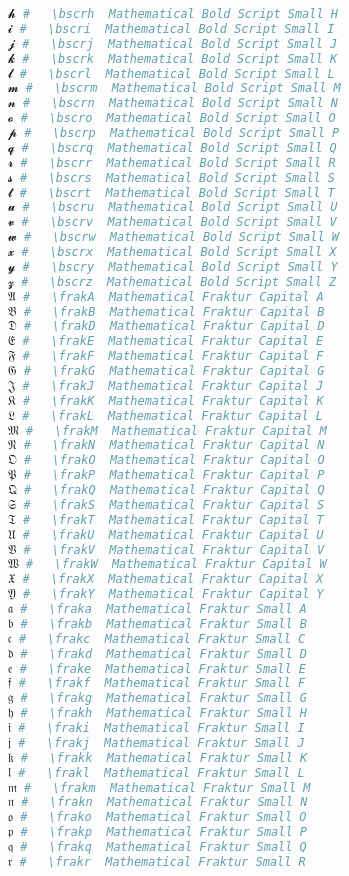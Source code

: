 \begin{lstlisting}[language=Julia, style=julia]
𝓱 #   \bscrh  Mathematical Bold Script Small H
𝓲 #   \bscri  Mathematical Bold Script Small I
𝓳 #   \bscrj  Mathematical Bold Script Small J
𝓴 #   \bscrk  Mathematical Bold Script Small K
𝓵 #   \bscrl  Mathematical Bold Script Small L
𝓶 #   \bscrm  Mathematical Bold Script Small M
𝓷 #   \bscrn  Mathematical Bold Script Small N
𝓸 #   \bscro  Mathematical Bold Script Small O
𝓹 #   \bscrp  Mathematical Bold Script Small P
𝓺 #   \bscrq  Mathematical Bold Script Small Q
𝓻 #   \bscrr  Mathematical Bold Script Small R
𝓼 #   \bscrs  Mathematical Bold Script Small S
𝓽 #   \bscrt  Mathematical Bold Script Small T
𝓾 #   \bscru  Mathematical Bold Script Small U
𝓿 #   \bscrv  Mathematical Bold Script Small V
𝔀 #   \bscrw  Mathematical Bold Script Small W
𝔁 #   \bscrx  Mathematical Bold Script Small X
𝔂 #   \bscry  Mathematical Bold Script Small Y
𝔃 #   \bscrz  Mathematical Bold Script Small Z
𝔄 #   \frakA  Mathematical Fraktur Capital A
𝔅 #   \frakB  Mathematical Fraktur Capital B
𝔇 #   \frakD  Mathematical Fraktur Capital D
𝔈 #   \frakE  Mathematical Fraktur Capital E
𝔉 #   \frakF  Mathematical Fraktur Capital F
𝔊 #   \frakG  Mathematical Fraktur Capital G
𝔍 #   \frakJ  Mathematical Fraktur Capital J
𝔎 #   \frakK  Mathematical Fraktur Capital K
𝔏 #   \frakL  Mathematical Fraktur Capital L
𝔐 #   \frakM  Mathematical Fraktur Capital M
𝔑 #   \frakN  Mathematical Fraktur Capital N
𝔒 #   \frakO  Mathematical Fraktur Capital O
𝔓 #   \frakP  Mathematical Fraktur Capital P
𝔔 #   \frakQ  Mathematical Fraktur Capital Q
𝔖 #   \frakS  Mathematical Fraktur Capital S
𝔗 #   \frakT  Mathematical Fraktur Capital T
𝔘 #   \frakU  Mathematical Fraktur Capital U
𝔙 #   \frakV  Mathematical Fraktur Capital V
𝔚 #   \frakW  Mathematical Fraktur Capital W
𝔛 #   \frakX  Mathematical Fraktur Capital X
𝔜 #   \frakY  Mathematical Fraktur Capital Y
𝔞 #   \fraka  Mathematical Fraktur Small A
𝔟 #   \frakb  Mathematical Fraktur Small B
𝔠 #   \frakc  Mathematical Fraktur Small C
𝔡 #   \frakd  Mathematical Fraktur Small D
𝔢 #   \frake  Mathematical Fraktur Small E
𝔣 #   \frakf  Mathematical Fraktur Small F
𝔤 #   \frakg  Mathematical Fraktur Small G
𝔥 #   \frakh  Mathematical Fraktur Small H
𝔦 #   \fraki  Mathematical Fraktur Small I
𝔧 #   \frakj  Mathematical Fraktur Small J
𝔨 #   \frakk  Mathematical Fraktur Small K
𝔩 #   \frakl  Mathematical Fraktur Small L
𝔪 #   \frakm  Mathematical Fraktur Small M
𝔫 #   \frakn  Mathematical Fraktur Small N
𝔬 #   \frako  Mathematical Fraktur Small O
𝔭 #   \frakp  Mathematical Fraktur Small P
𝔮 #   \frakq  Mathematical Fraktur Small Q
𝔯 #   \frakr  Mathematical Fraktur Small R

\end{lstlisting}
